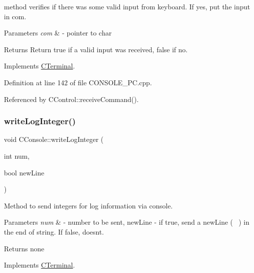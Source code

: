 method verifies if there was some valid input from keyboard. If yes, put the input in com. 
\begin{DoxyParams}{Parameters}
{\em com} & -\/ pointer to char \\
\hline
\end{DoxyParams}
\begin{DoxyReturn}{Returns}
Return true if a valid input was received, false if no. 
\end{DoxyReturn}


Implements \mbox{\hyperlink{class_c_terminal}{C\+Terminal}}.



Definition at line 142 of file C\+O\+N\+S\+O\+L\+E\+\_\+\+P\+C.\+cpp.



Referenced by C\+Control\+::receive\+Command().

\mbox{\label{class_c_console_ad6f84380de57942510c8abfc5226f6c5}} 
\subsubsection{\texorpdfstring{write\+Log\+Integer()}{writeLogInteger()}}
{\footnotesize\ttfamily void C\+Console\+::write\+Log\+Integer (\begin{DoxyParamCaption}\item[{int}]{num,  }\item[{bool}]{new\+Line }\end{DoxyParamCaption})\hspace{0.3cm}{\ttfamily [virtual]}}



Method to send integers for log information via console. 


\begin{DoxyParams}{Parameters}
{\em num} & -\/ number to be sent, new\+Line -\/ if true, send a new\+Line (~\newline
) in the end of string. If false, doesn\textquotesingle{}t. \\
\hline
\end{DoxyParams}
\begin{DoxyReturn}{Returns}
none 
\end{DoxyReturn}


Implements \mbox{\hyperlink{class_c_terminal}{C\+Terminal}}.



